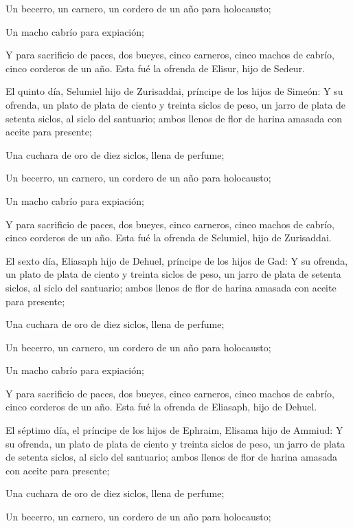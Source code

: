  Un becerro, un carnero, un cordero de un año para
holocausto;

 Un macho cabrío para expiación;

 Y para sacrificio de paces, dos bueyes, cinco carneros,
cinco machos de cabrío, cinco corderos de un año. Esta fué la ofrenda de
Elisur, hijo de Sedeur.

 El quinto día, Selumiel hijo de Zurisaddai, príncipe de
los hijos de Simeón:  Y su ofrenda, un plato de plata de
ciento y treinta siclos de peso, un jarro de plata de setenta siclos, al
siclo del santuario; ambos llenos de flor de harina amasada con aceite
para presente;

 Una cuchara de oro de diez siclos, llena de perfume;

 Un becerro, un carnero, un cordero de un año para
holocausto;

 Un macho cabrío para expiación;

 Y para sacrificio de paces, dos bueyes, cinco carneros,
cinco machos de cabrío, cinco corderos de un año. Esta fué la ofrenda de
Selumiel, hijo de Zurisaddai.

 El sexto día, Eliasaph hijo de Dehuel, príncipe de los
hijos de Gad:  Y su ofrenda, un plato de plata de ciento y
treinta siclos de peso, un jarro de plata de setenta siclos, al siclo
del santuario; ambos llenos de flor de harina amasada con aceite para
presente;

 Una cuchara de oro de diez siclos, llena de perfume;

 Un becerro, un carnero, un cordero de un año para
holocausto;

 Un macho cabrío para expiación;

 Y para sacrificio de paces, dos bueyes, cinco carneros,
cinco machos de cabrío, cinco corderos de un año. Esta fué la ofrenda de
Eliasaph, hijo de Dehuel.

 El séptimo día, el príncipe de los hijos de Ephraim,
Elisama hijo de Ammiud:  Y su ofrenda, un plato de plata de
ciento y treinta siclos de peso, un jarro de plata de setenta siclos, al
siclo del santuario; ambos llenos de flor de harina amasada con aceite
para presente;

 Una cuchara de oro de diez siclos, llena de perfume;

 Un becerro, un carnero, un cordero de un año para
holocausto;


